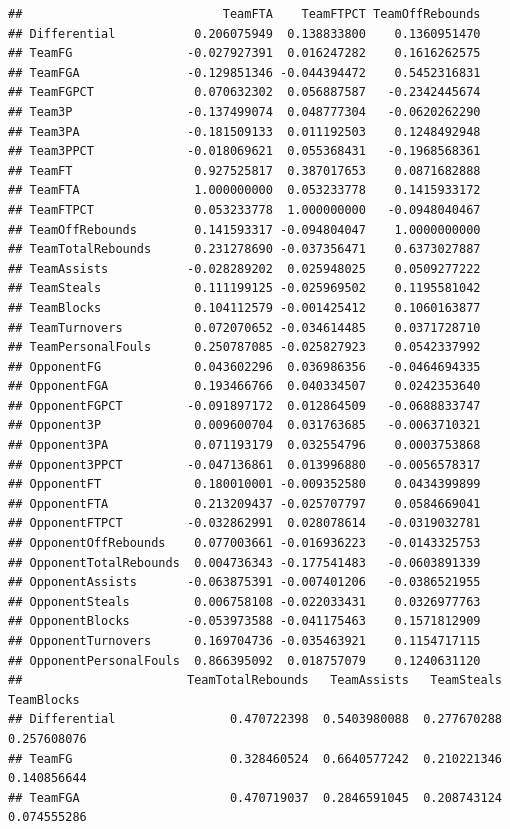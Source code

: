 \documentclass[
]{book}
\begin{document}
\begin{verbatim}
##                            TeamFTA    TeamFTPCT TeamOffRebounds
## Differential           0.206075949  0.138833800    0.1360951470
## TeamFG                -0.027927391  0.016247282    0.1616262575
## TeamFGA               -0.129851346 -0.044394472    0.5452316831
## TeamFGPCT              0.070632302  0.056887587   -0.2342445674
## Team3P                -0.137499074  0.048777304   -0.0620262290
## Team3PA               -0.181509133  0.011192503    0.1248492948
## Team3PPCT             -0.018069621  0.055368431   -0.1968568361
## TeamFT                 0.927525817  0.387017653    0.0871682888
## TeamFTA                1.000000000  0.053233778    0.1415933172
## TeamFTPCT              0.053233778  1.000000000   -0.0948040467
## TeamOffRebounds        0.141593317 -0.094804047    1.0000000000
## TeamTotalRebounds      0.231278690 -0.037356471    0.6373027887
## TeamAssists           -0.028289202  0.025948025    0.0509277222
## TeamSteals             0.111199125 -0.025969502    0.1195581042
## TeamBlocks             0.104112579 -0.001425412    0.1060163877
## TeamTurnovers          0.072070652 -0.034614485    0.0371728710
## TeamPersonalFouls      0.250787085 -0.025827923    0.0542337992
## OpponentFG             0.043602296  0.036986356   -0.0464694335
## OpponentFGA            0.193466766  0.040334507    0.0242353640
## OpponentFGPCT         -0.091897172  0.012864509   -0.0688833747
## Opponent3P             0.009600704  0.031763685   -0.0063710321
## Opponent3PA            0.071193179  0.032554796    0.0003753868
## Opponent3PPCT         -0.047136861  0.013996880   -0.0056578317
## OpponentFT             0.180010001 -0.009352580    0.0434399899
## OpponentFTA            0.213209437 -0.025707797    0.0584669041
## OpponentFTPCT         -0.032862991  0.028078614   -0.0319032781
## OpponentOffRebounds    0.077003661 -0.016936223   -0.0143325753
## OpponentTotalRebounds  0.004736343 -0.177541483   -0.0603891339
## OpponentAssists       -0.063875391 -0.007401206   -0.0386521955
## OpponentSteals         0.006758108 -0.022033431    0.0326977763
## OpponentBlocks        -0.053973588 -0.041175463    0.1571812909
## OpponentTurnovers      0.169704736 -0.035463921    0.1154717115
## OpponentPersonalFouls  0.866395092  0.018757079    0.1240631120
##                       TeamTotalRebounds   TeamAssists   TeamSteals   TeamBlocks
## Differential                0.470722398  0.5403980088  0.277670288  0.257608076
## TeamFG                      0.328460524  0.6640577242  0.210221346  0.140856644
## TeamFGA                     0.470719037  0.2846591045  0.208743124  0.074555286

\end{verbatim}
\end{document}
